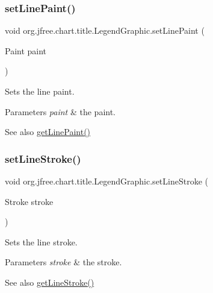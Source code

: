 \subsubsection{\texorpdfstring{set\+Line\+Paint()}{setLinePaint()}}
{\footnotesize\ttfamily void org.\+jfree.\+chart.\+title.\+Legend\+Graphic.\+set\+Line\+Paint (\begin{DoxyParamCaption}\item[{Paint}]{paint }\end{DoxyParamCaption})}

Sets the line paint.


\begin{DoxyParams}{Parameters}
{\em paint} & the paint.\\
\hline
\end{DoxyParams}
\begin{DoxySeeAlso}{See also}
\mbox{\hyperlink{classorg_1_1jfree_1_1chart_1_1title_1_1_legend_graphic_a6b401a8f825fcf68b9e3ac3eeb5669ef}{get\+Line\+Paint()}} 
\end{DoxySeeAlso}
\mbox{\label{classorg_1_1jfree_1_1chart_1_1title_1_1_legend_graphic_ab9a168a247bab74b0ca95c251d1ea9e7}} 
\subsubsection{\texorpdfstring{set\+Line\+Stroke()}{setLineStroke()}}
{\footnotesize\ttfamily void org.\+jfree.\+chart.\+title.\+Legend\+Graphic.\+set\+Line\+Stroke (\begin{DoxyParamCaption}\item[{Stroke}]{stroke }\end{DoxyParamCaption})}

Sets the line stroke.


\begin{DoxyParams}{Parameters}
{\em stroke} & the stroke.\\
\hline
\end{DoxyParams}
\begin{DoxySeeAlso}{See also}
\mbox{\hyperlink{classorg_1_1jfree_1_1chart_1_1title_1_1_legend_graphic_af9f4ca73029c94ecb41142b7299bbde0}{get\+Line\+Stroke()}} 
\end{DoxySeeAlso}
\mbox{\label{classorg_1_1jfree_1_1chart_1_1title_1_1_legend_graphic_a5723644cc122bf1a69c802c973201dca}} 
